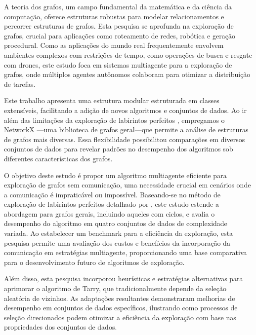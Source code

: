A teoria dos grafos, um campo fundamental da matemática e da ciência da computação, oferece estruturas robustas para modelar relacionamentos e percorrer estruturas de grafos. Esta pesquisa se aprofunda na exploração de grafos, crucial para aplicações como roteamento de redes, robótica e geração procedural. Como as aplicações do mundo real frequentemente envolvem ambientes complexos com restrições de tempo, como operações de busca e resgate com drones, este estudo foca em sistemas multiagente para a exploração de grafos, onde múltiplos agentes autônomos colaboram para otimizar a distribuição de tarefas.

Este trabalho apresenta uma estrutura modular estruturada em classes extensíveis, facilitando a adição de novos algoritmos e conjuntos de dados. Ao ir além das limitações da exploração de labirintos perfeitos \cite{Naeem2021}, empregamos o NetworkX \cite{Hagberg2008}—uma biblioteca de grafos geral—que permite a análise de estruturas de grafos mais diversas. Essa flexibilidade possibilitou comparações em diversos conjuntos de dados para revelar padrões no desempenho dos algoritmos sob diferentes características dos grafos.

O objetivo deste estudo é propor um algoritmo multiagente eficiente para exploração de grafos sem comunicação, uma necessidade crucial em cenários onde a comunicação é impraticável ou impossível. Baseando-se no método de exploração de labirintos perfeitos detalhado por , este estudo estende a abordagem para grafos gerais, incluindo aqueles com ciclos, e avalia o desempenho do algoritmo em quatro conjuntos de dados de complexidade variada. Ao estabelecer um benchmark para a eficiência da exploração, esta pesquisa permite uma avaliação dos custos e benefícios da incorporação da comunicação em estratégias multiagente, proporcionando uma base comparativa para o desenvolvimento futuro de algoritmos de exploração.

Além disso, esta pesquisa incorporou heurísticas e estratégias alternativas para aprimorar o algoritmo de Tarry, que tradicionalmente depende da seleção aleatória de vizinhos. As adaptações resultantes demonstraram melhorias de desempenho em conjuntos de dados específicos, ilustrando como processos de seleção direcionados podem otimizar a eficiência da exploração com base nas propriedades dos conjuntos de dados.